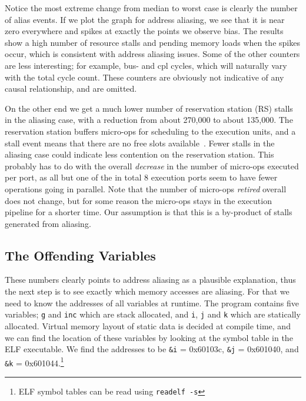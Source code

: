 \documentclass[a4paper,10pt,twocolumn,twoside]{article}
\begin{document}
Notice the most extreme change from median to worst case is clearly the number of alias events.
If we plot the graph for address aliasing, we see that it is near zero everywhere and spikes at exactly the points we observe bias. 
The results show a high number of resource stalls and pending memory loads when the spikes occur, which is consistent with address aliasing issues.
Some of the other counters are less interesting; for example, bus- and cpl cycles, which will naturally vary with the total cycle count.
These counters are obviously not indicative of any causal relationship, and are omitted.

On the other end we get a much lower number of reservation station (RS) stalls in the aliasing case, with a reduction from about 270,000 to about 135,000.
The reservation station buffers micro-ops for scheduling to the execution units, and a stall event means that there are no free slots available~\cite[Table 19-2]{Intel:2013:Volume3B}.
Fewer stalls in the aliasing case could indicate less contention on the reservation station.
This probably has to do with the overall \emph{decrease} in the number of micro-ops executed per port, as all but one of the in total 8 execution ports seem to have fewer operations going in parallel.
Note that the number of micro-ops \emph{retired} overall does not change, but for some reason the micro-ops stays in the execution pipeline for a shorter time.
Our assumption is that this is a by-product of stalls generated from aliasing.

\subsection{The Offending Variables}
These numbers clearly points to address aliasing as a plausible explanation, thus the next step is to see exactly which memory accesses are aliasing. 
For that we need to know the addresses of all variables at runtime.
The program contains five variables; \texttt{g} and \texttt{inc} which are stack allocated, and \texttt{i}, \texttt{j} and \texttt{k} which are statically allocated.
Virtual memory layout of static data is decided at compile time, and we can find the location of these variables by looking at the symbol table in the ELF executable.
We find the addresses to be \texttt{\&i} = 0x60103c, \texttt{\&j} = 0x601040, and \texttt{\&k} = 0x601044.\footnote{ELF symbol tables can be read using \texttt{readelf -s}}
\end{document}
